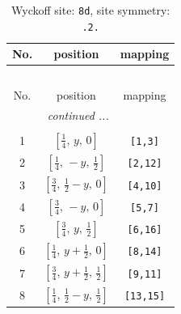 \documentclass[fleqn,8pt]{jsarticle}
\begin{document}
\begin{longtable}{ccc}
\caption{Wyckoff site: {\tt 8d}, site symmetry: {\tt .2.}}
 \\
 \hline \hline
No. & position & mapping \\ \hline \endfirsthead

\multicolumn{2}{l}{\tablename\ \thetable{}} \\
 \hline \hline
No. & position & mapping \\ \hline \endhead

 \hline \hline
\multicolumn{2}{r}{\footnotesize\it continued ...} \\ \endfoot

 \hline \hline
\multicolumn{2}{r}{} \\ \endlastfoot

1 & $\left[ \frac{1}{4},\, y,\, 0 \right]$ & {\tt [1,3]} \\ \hline
2 & $\left[ \frac{1}{4},\, - y,\, \frac{1}{2} \right]$ & {\tt [2,12]} \\ \hline
3 & $\left[ \frac{3}{4},\, \frac{1}{2} - y,\, 0 \right]$ & {\tt [4,10]} \\ \hline
4 & $\left[ \frac{3}{4},\, - y,\, 0 \right]$ & {\tt [5,7]} \\ \hline
5 & $\left[ \frac{3}{4},\, y,\, \frac{1}{2} \right]$ & {\tt [6,16]} \\ \hline
6 & $\left[ \frac{1}{4},\, y + \frac{1}{2},\, 0 \right]$ & {\tt [8,14]} \\ \hline
7 & $\left[ \frac{3}{4},\, y + \frac{1}{2},\, \frac{1}{2} \right]$ & {\tt [9,11]} \\ \hline
8 & $\left[ \frac{1}{4},\, \frac{1}{2} - y,\, \frac{1}{2} \right]$ & {\tt [13,15]} \\
\end{longtable}
\renewcommand{\arraystretch}{1.2}
\end{document}
